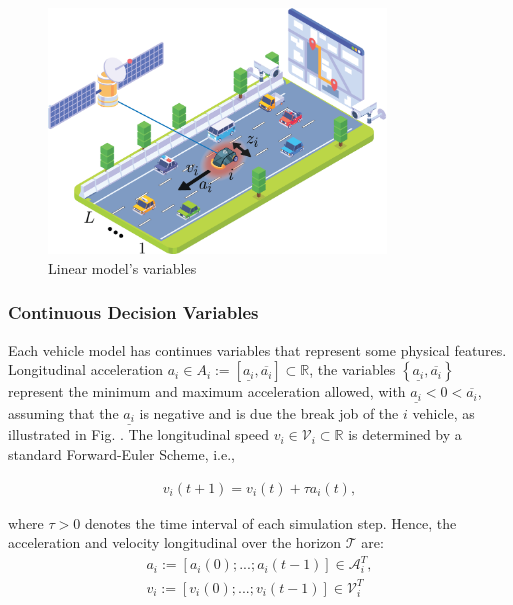 \begin{figure}[H]
    \centering
    \includegraphics[width=0.8\textwidth]{Kap3/linear_model.png}
    \caption{Linear model's variables}
    \label{fig:variables}
\end{figure}


\subsubsection{Continuous Decision Variables}
Each vehicle model has continues variables that represent some physical features. Longitudinal acceleration $a_i \in A_i := \left [ \underline{a_i}, \overline{a_i} \right ] \subset \mathbb{R}$, the variables $\left \{ \underline{a_i}, \overline{a_i} \right \}
$ represent the minimum and maximum acceleration allowed, with $\underline{a_i}< 0 <  \overline{a_i} $, assuming that the $\underline{a_i}$ is negative and is due the break job of the $i$ vehicle, as illustrated in Fig. \label{fig:variables}. The longitudinal speed $v_i \in \mathcal{V}_i \subset \mathbb{R}$ is determined by a standard Forward-Euler Scheme, i.e.,

\begin{gather}
v_i(t+1) = v_i(t) + \tau a_i(t),
\end{gather}

where $\tau > 0$ denotes the time interval of each simulation step. Hence, the acceleration and velocity longitudinal over the horizon $\mathcal{T}$ are: 
\begin{gather*}
a_i := \left [ a_i(0); ...; a_i(t-1) \right ] \in \mathcal{A}^T_i, \\
v_i := \left [ v_i(0); ...; v_i(t-1) \right ] \in \mathcal{V}^T_i
\end{gather*}





